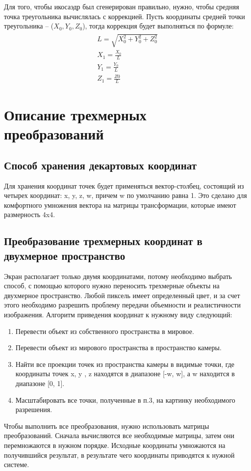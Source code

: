 Для того, чтобы икосаэдр был сгенерирован правильно, нужно, чтобы средняя точка треугольника вычислялась с коррекцией. Пусть координаты средней точки треугольника – ($X_0, Y_0, Z_0$), тогда коррекция будет выполняться по формуле:
\begin{align}
	\begin{gathered}
	L =\sqrt{X_0^2 + Y_0^2 + Z_0^2}\\
	X_1 =\frac{X_0}{L}\\
	Y_1 =\frac{Y_0}{L}\\
	Z_1 =\frac{Z0}{L}
	\end{gathered}
\end{align}
\section{Описание трехмерных преобразований}
\subsection{Способ хранения декартовых координат}
Для хранения координат точек будет применяться вектор-столбец,
состоящий из четырех координат: x, y, z, w, причем w по умолчанию равна 1. Это сделано для комфортного умножения вектора на матрицы трансформации, которые имеют размерность 4x4.
\subsection{Преобразование трехмерных координат в двухмерное пространство}
Экран располагает только двумя координатами, потому необходимо выбрать способ, с помощью которого нужно переносить трехмерные объекты на двухмерное пространство. Любой пиксель имеет определенный цвет, и за счет этого необходимо разрешить проблему передачи объемности и реалистичности изображения.
Алгоритм приведения координат к нужному виду следующий:
\begin{enumerate}
\item Перевести объект из собственного пространства в мировое.
\item Перевести объект из мирового пространства в пространство камеры.
\item Найти все проекции точек из пространства камеры в видимые точки, где координаты точек x, y , z находятся в диапазоне [-w, w], а w находится в диапазоне [0, 1].
\item Масштабировать все точки, полученные в п.3, на картинку необходимого разрешения.
\end{enumerate}
Чтобы выполнить все преобразования, нужно использовать матрицы преобразований. Сначала вычисляются все необходимые матрицы, затем они перемножаются в нужном порядке. Исходные координаты умножаются на получившийся результат, в результате чего координаты приводятся к нужной системе.
